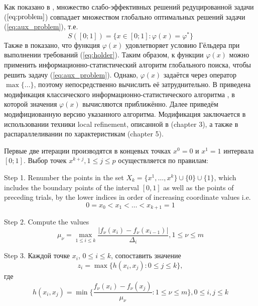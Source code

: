 \documentclass{llncs}
\begin{document}
Как показано в \cite{markinStrongin1993}, множество слабо-эффективных решений редуцированной задачи (\(\ref{eq:problem}\)) совпадает множеством глобально оптимальных решений задачи (\ref{eq:aux_problem}), т.е.
\begin{equation}
  \label{eq:s}
  S([0;1])=\{x\in [0;1]:\varphi(x)=\varphi^*\}
\end{equation}
Также в \cite{markinStrongin1993} показано, что функция \(\varphi(x)\) удовлетворяет условию Гёльдера при выполнении требований (\ref{eq:holder}). Таким образом, к функции \(\varphi(x)\) можно применить информационно-статистический алгоритм глобального поиска, чтобы решить задачу (\ref{eq:aux_problem}). Однако, \(\varphi(x)\) задаётся через оператор \(\max\{...\}\), поэтому непосредственно вычислить её затруднительно. В \cite{markinStrongin1993} приведена модификация классического информационно-статистического алгоритма \cite{mixedAlg}, в которой значения \(\varphi(x)\) вычисляются приближённо. Далее приведём модифициованную версию указанного алгоритма. Модификация заключается в использовании техники local refinement, описанной в \cite{strOptBook}(chapter 3), а также в распараллеливании по характеристикам \cite{strOptBook}(chapter 5).

Первые две итерации производятся в концевых точках \(x^0=0\) и \(x^1=1\) интервала \([0;1]\). Выбор точек \(x^{k+j}, 1\leqslant j\leqslant p\) осуществляется по правилам:

Step 1. Renumber the points in the set \(X_k=\{x^1,\dotsc,x^k\}\cup\{0\}\cup\{1\}\), which includes the boundary points of the interval \([0,1]\) as well as the points of preceding trials, by the lower indices in order of increasing coordinate values  i.e.
\begin{displaymath}
  0=x_0<x_1<\dotsc<x_{k+1}=1
\end{displaymath}

Step 2. Compute the values
\begin{equation}
\label{step2}
\mu_\nu=\max_{1\leqslant i\leqslant k}\dfrac{|f_\nu(x_i)-f_\nu(x_{i-1})|}{\Delta_i}, 1\leqslant \nu\leqslant m
\end{equation}

Step 3. Каждой точке \(x_i\), \(0\leqslant i\leqslant k\), сопоставить значение
\begin{equation}
  z_i=\max\{h(x_i,x_j):0\leqslant j\leqslant k\},
\end{equation}
где
\begin{equation}
  h(x_i,x_j)=\min\{\frac{f_\nu(x_i)-f_\nu(x_j)}{\mu_\nu}:1\leqslant \nu\leqslant m\}, 0\leqslant i,j\leqslant k
\end{equation}
\end{document}
